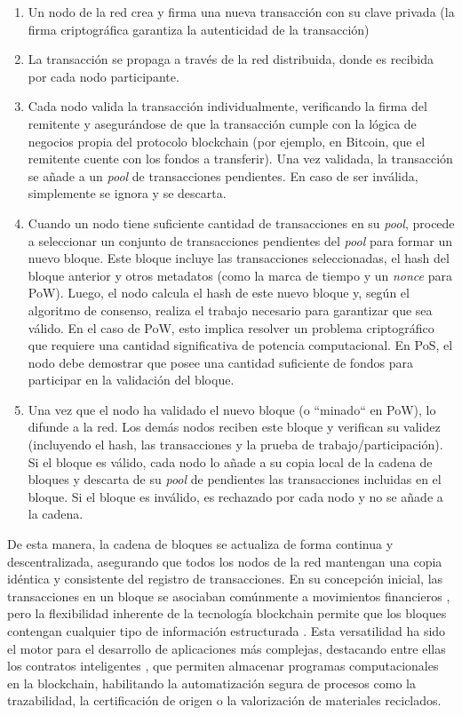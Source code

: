\begin{enumerate}
    \item Un nodo de la red crea y firma una nueva transacción con su clave privada (la firma criptográfica garantiza la autenticidad de la transacción)
    \item La transacción se propaga a través de la red distribuida, donde es recibida por cada nodo participante.
    \item Cada nodo valida la transacción individualmente, verificando la firma del remitente y asegurándose de que la transacción cumple con la lógica de negocios propia del protocolo blockchain (por ejemplo, en Bitcoin, que el remitente cuente con los fondos a transferir). Una vez validada, la transacción se añade a un \textit{pool} de transacciones pendientes. En caso de ser inválida, simplemente se ignora y se descarta. 
    \item Cuando un nodo tiene suficiente cantidad de transacciones en su \textit{pool}, procede a seleccionar un conjunto de transacciones pendientes del \textit{pool} para formar un nuevo bloque. Este bloque incluye las transacciones seleccionadas, el hash del bloque anterior y otros metadatos (como la marca de tiempo y un \textit{nonce} para PoW). Luego, el nodo calcula el hash de este nuevo bloque y, según el algoritmo de consenso, realiza el trabajo necesario para garantizar que sea válido. En el caso de PoW, esto implica resolver un problema criptográfico que requiere una cantidad significativa de potencia computacional. En PoS, el nodo debe demostrar que posee una cantidad suficiente de fondos para participar en la validación del bloque.
    \item Una vez que el nodo ha validado el nuevo bloque (o ``minado`` en PoW), lo difunde a la red. Los demás nodos reciben este bloque y verifican su validez (incluyendo el hash, las transacciones y la prueba de trabajo/participación). Si el bloque es válido, cada nodo lo añade a su copia local de la cadena de bloques y descarta de su \textit{pool} de pendientes las transacciones incluidas en el bloque. Si el bloque es inválido, es rechazado por cada nodo y no se añade a la cadena.
\end{enumerate}

De esta manera, la cadena de bloques se actualiza de forma continua y descentralizada, asegurando que todos los nodos de la red mantengan una copia idéntica y consistente del registro de transacciones. En su concepción inicial, las transacciones en un bloque se asociaban comúnmente a movimientos financieros \cite{satoshi2008bitcoin}, pero la flexibilidad inherente de la tecnología blockchain permite que los bloques contengan cualquier tipo de información estructurada \cite{bartolomeo2020introduccion}. Esta versatilidad ha sido el motor para el desarrollo de aplicaciones más complejas, destacando entre ellas los contratos inteligentes \cite{sunny2022systematic}, que permiten almacenar programas computacionales en la blockchain, habilitando la automatización segura de procesos como la trazabilidad, la certificación de origen o la valorización de materiales reciclados.

